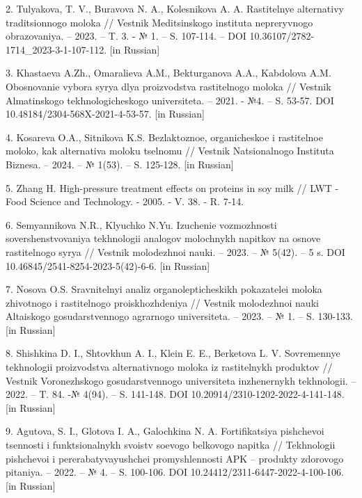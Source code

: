 2. Tulyakova, T. V., Buravova N. A., Kolesnikova A. A.
Rastitel\textquotesingle nye al\textquotesingle ternativy traditsionnogo
moloka // Vestnik Meditsinskogo instituta nepreryvnogo obrazovaniya. --
2023. -- T. 3. - № 1. -- S. 107-114. -- DOI
10.36107/2782-1714\_2023-3-1-107-112. {[}in Russian{]}

3. Khastaeva A.Zh., Omaralieva A.M., Bekturganova A.A., Kabdolova A.M.
Obosnovanie vybora syr\textquotesingle ya dlya proizvodstva
rastitel\textquotesingle nogo moloka // Vestnik Almatinskogo
tekhnologicheskogo universiteta. -- 2021. - №4. -- S. 53-57. DOI
10.48184/2304-568X-2021-4-53-57. {[}in Russian{]}

4. Kosareva O.A., Sitnikova K.S. Bezlaktoznoe, organicheskoe i
rastitel\textquotesingle noe moloko, kak al\textquotesingle ternativa
moloku tsel\textquotesingle nomu // Vestnik
Natsional\textquotesingle nogo Instituta Biznesa. -- 2024. -- № 1(53).
-- S. 125-128. {[}in Russian{]}

5. Zhang H. High-pressure treatment effects on proteins in soy milk //
LWT - Food Science and Technology. - 2005. - V. 38. - R. 7-14.

6. Semyannikova N.R., Klyuchko N.Yu. Izuchenie vozmozhnosti
sovershenstvovaniya tekhnologii analogov molochnykh napitkov na osnove
rastitel\textquotesingle nogo syr\textquotesingle ya // Vestnik
molodezhnoi nauki. -- 2023. -- № 5(42). -- 5 s. DOI
10.46845/2541-8254-2023-5(42)-6-6. {[}in Russian{]}

7. Nosova O.S. Sravnitel\textquotesingle nyi analiz organolepticheskikh
pokazatelei moloka zhivotnogo i rastitel\textquotesingle nogo
proiskhozhdeniya // Vestnik molodezhnoi nauki Altaiskogo
gosudarstvennogo agrarnogo universiteta. -- 2023. -- № 1. -- S. 130-133.
{[}in Russian{]}

8. Shishkina D. I., Shtovkhun A. I., Klein E. E., Berketova L. V.
Sovremennye tekhnologii proizvodstva al\textquotesingle ternativnogo
moloka iz rastitel\textquotesingle nykh produktov // Vestnik
Voronezhskogo gosudarstvennogo universiteta inzhenernykh tekhnologii. --
2022. -- T. 84. -№ 4(94). -- S. 141-148. DOI
10.20914/2310-1202-2022-4-141-148. {[}in Russian{]}

9. Agutova, S. I., Glotova I. A., Galochkina N. A. Fortifikatsiya
pishchevoi tsennosti i funktsional\textquotesingle nykh svoistv soevogo
belkovogo napitka // Tekhnologii pishchevoi i pererabatyvayushchei
promyshlennosti APK -- produkty zdorovogo pitaniya. -- 2022. -- № 4. --
S. 100-106. DOI 10.24412/2311-6447-2022-4-100-106. {[}in Russian{]}

